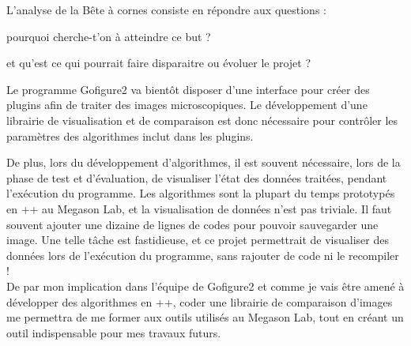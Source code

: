 L'analyse de la Bête à cornes consiste en répondre aux questions :
\begin{inparaenum}[(i)] 
  \item pourquoi cherche-t'on à atteindre ce but ?
  \item et qu'est ce qui pourrait faire disparaitre ou évoluer le projet ?
\end{inparaenum}

Le programme Gofigure2 va bientôt disposer d'une interface pour créer des plugins afin de traiter des images microscopiques.
Le développement d'une librairie de visualisation et de comparaison est donc nécessaire
pour contrôler les paramètres des algorithmes inclut dans les plugins.

De plus, lors du développement d'algorithmes,
il est souvent nécessaire, lors de la phase de test et d'évaluation,
de visualiser l'état des données traitées, pendant l'exécution du programme.
Les algorithmes sont la plupart du temps prototypés en \C++ au Megason Lab, et la visualisation de données n'est pas triviale.
Il faut souvent ajouter une dizaine de lignes de codes pour pouvoir sauvegarder une image.
Une telle tâche est fastidieuse, et ce projet permettrait de visualiser
des données lors de l'exécution du programme, sans rajouter de code ni le recompiler !\\

De par mon implication dans l'équipe de Gofigure2 et
comme je vais être amené à développer des algorithmes en {\C++},
coder une librairie de comparaison d'images me permettra de me former aux outils utilisés au Megason Lab,
tout en créant un outil indispensable pour mes travaux futurs.

